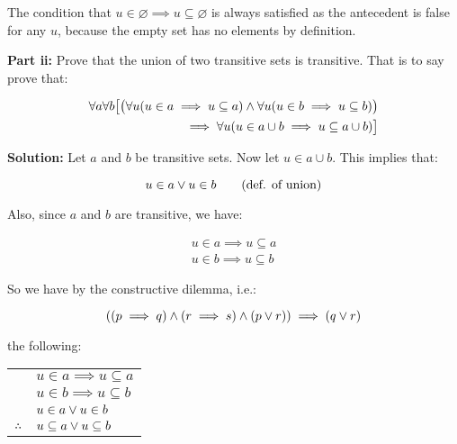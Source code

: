 \documentclass{article}
\begin{document}
The condition that $u\in \varnothing\implies u\subseteq \varnothing$ is always satisfied as the antecedent is false for any $u$, because the empty set has no elements by definition.
\bigskip

\noindent\textbf{Part ii:} Prove that the union of two transitive sets is transitive. That is to say prove that:

\begin{align*}
    \forall a\forall b\big[\big(\forall u(u\in a\implies u\subseteq a)\wedge\forall u(u\in b\implies u\subseteq b)\big)\\
    \implies\forall u(u\in a\cup b\implies u\subseteq a\cup b)\big]
\end{align*}

\noindent\textbf{Solution:} Let $a$ and $b$ be transitive sets. Now let $u\in a\cup b$. This implies that:

\begin{equation}
    u\in a \vee u\in b\tag{def. of union}
\end{equation}

Also, since $a$ and $b$ are transitive, we have:

\begin{gather*}
    u\in a\implies u\subseteq a\tag{def. of transitive}\\
    u\in b\implies u\subseteq b\tag{def. of transitive}
\end{gather*}

So we have by the constructive dilemma, i.e.:

$$((p\implies q)\wedge(r\implies s)\wedge(p\vee r))\implies (q\vee r)$$

the following:

\begin{center}
\begin{tabular}{c@{\,}l@{}} 
    & $u\in a\implies u\subseteq a$ \\
    & $u\in b\implies u\subseteq b$ \\
    & $u\in a \vee u\in b$ \\
    \cline{2-2}
$\therefore$         & $u\subseteq a\vee u\subseteq b$ \\
\end{tabular}
\end{center}

\end{document}
